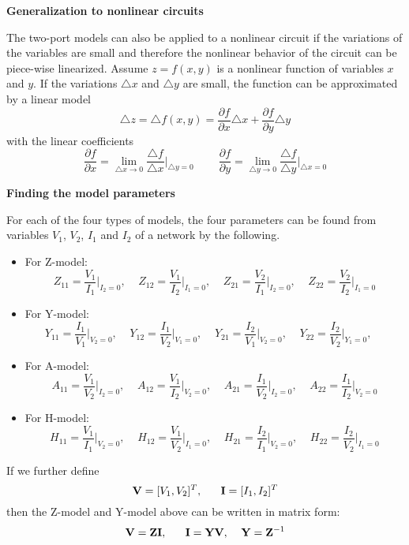 \begin{itemize}
\begin{itemize}
\end{itemize}

{\bf Generalization to nonlinear circuits}

The two-port models can also be applied to a nonlinear circuit if the 
variations of the variables are small and therefore the nonlinear behavior 
of the circuit can be piece-wise linearized. Assume $z=f(x,y)$ is a nonlinear
function of variables $x$ and $y$. If the variations $\triangle x$ and 
$\triangle y$ are small, the function can be approximated by a linear 
model 
\[ \triangle z=\triangle f(x,y)=\frac{\partial f}{\partial x}\triangle x +
                    \frac{\partial f}{\partial y}\triangle y  \]
with the linear coefficients
\[ \frac{\partial f}{\partial x}=\lim_{\triangle x\rightarrow 0}
   \frac{\triangle f}{\triangle x}\bigg|_{\triangle y=0}
   \;\;\;\;\;\;\;\;
   \frac{\partial f}{\partial y}=\lim_{\triangle y\rightarrow 0}
   \frac{\triangle f}{\triangle y}\bigg|_{\triangle x=0}
\]

{\bf Finding the model parameters}

For each of the four types of models, the four parameters can be found
from variables $V_1$, $V_2$, $I_1$ and $I_2$ of a network by the following.
\begin{itemize}
\item For Z-model:
\[	Z_{11}=\frac{V_1}{I_1}\bigg|_{I_2=0},\;\;\;\;
	Z_{12}=\frac{V_1}{I_2}\bigg|_{I_1=0},\;\;\;\;
	Z_{21}=\frac{V_2}{I_1}\bigg|_{I_2=0},\;\;\;\;
	Z_{22}=\frac{V_2}{I_2}\bigg|_{I_1=0}
\]
\item For Y-model:
\[	Y_{11}=\frac{I_1}{V_1}\bigg|_{V_2=0},\;\;\;\;
	Y_{12}=\frac{I_1}{V_2}\bigg|_{V_1=0},\;\;\;\;
	Y_{21}=\frac{I_2}{V_1}\bigg|_{V_2=0},\;\;\;\;
	Y_{22}=\frac{I_2}{V_2}\bigg|_{Y_1=0},\;\;\;\;
\]
\item For A-model:
\[	A_{11}=\frac{V_1}{V_2}\bigg|_{I_2=0},\;\;\;\;
	A_{12}=\frac{V_1}{I_2}\bigg|_{V_2=0},\;\;\;\;
	A_{21}=\frac{I_1}{V_2}\bigg|_{I_2=0},\;\;\;\;
	A_{22}=\frac{I_1}{I_2}\bigg|_{V_2=0}
\]
\item For H-model:
\[	H_{11}=\frac{V_1}{I_1}\bigg|_{V_2=0},\;\;\;\;
	H_{12}=\frac{V_1}{V_2}\bigg|_{I_1=0},\;\;\;\;
	H_{21}=\frac{I_2}{I_1}\bigg|_{V_2=0},\;\;\;\;
	H_{22}=\frac{I_2}{V_2}\bigg|_{I_1=0}
\]
\end{itemize}

If we further define
\[	{\bf V}=[V_1, V_2]^T,\;\;\;\;\;\;{\bf I}=[I_1, I_2]^T	\]
then the Z-model and Y-model above can be written in matrix form:
\[ {\bf V}={\bf Z} {\bf I},\;\;\;\;\;\;{\bf I}={\bf Y} {\bf V},\;\;\;\;
	{\bf Y}={\bf Z}^{-1}		\]


\end{itemize}
